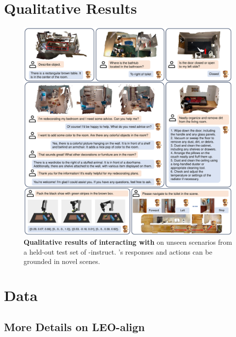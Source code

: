\clearpage

\renewcommand{\thefigure}{A.\arabic{figure}}
\renewcommand{\thetable}{A.\arabic{table}}
\renewcommand{\theequation}{A.\arabic{equation}}
\setcounter{figure}{0}
\setcounter{table}{0}
\setcounter{equation}{0}


\section{Qualitative Results}
\begin{figure}[h!]
\centering
\includegraphics[width=\textwidth, keepaspectratio]{figs/qualitative_results_v3.pdf}%
\caption{\label{fig:qualitative} \textbf{Qualitative results of interacting with \agent} on unseen scenarios from a held-out test set of \agent-instruct. \agent's responses and actions can be grounded in novel scenes.}
  \vspace{-16pt}
\end{figure}

\section{Data}\label{app:dataset}


\subsection{More Details on LEO-align}\label{app:dataset:leo_align}
